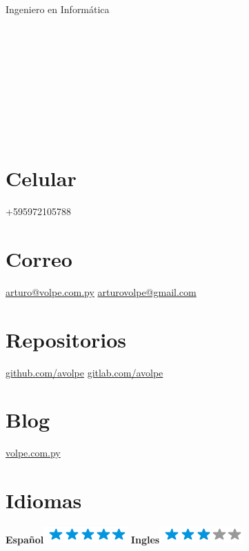 \documentclass[]{friggeri-cv}
\begin{document}
{Ingeniero en Informática}


\begin{aside}
	\section{}~
    \section{}~
    \section{}~
    \section{Celular}
        +595972105788
        ~
    \section{Correo}
        \href{mailto:arturo@volpe.com.py}{arturo@volpe.com.py}
        \href{mailto:arturovolpe@gmail.com}{arturovolpe@gmail.com}
        ~
    \section{Repositorios}
        \href{https://github.com/avolpe}{github.com/avolpe}
        \href{https://gitlab.com/avolpe}{gitlab.com/avolpe}
        ~
    \section{Blog}
        \href{https://www.volpe.com.py}{volpe.com.py}
        ~
\section{Idiomas}
\textbf{Español}\includegraphics[scale=0.40]{img/5stars.png}
\textbf{Ingles}\includegraphics[scale=0.40]{img/3stars.png}
\end{aside}
\end{document}
